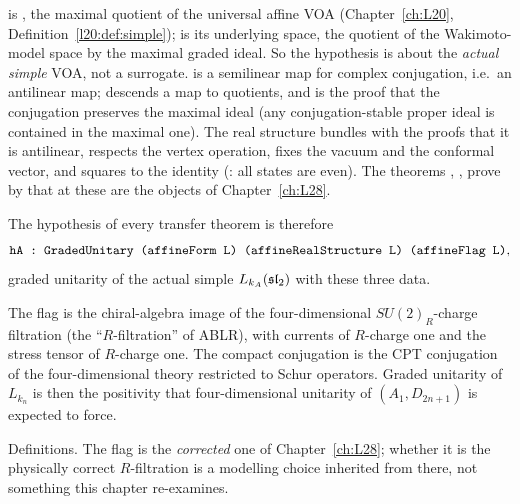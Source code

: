 \begin{dictionary}
 is , the maximal quotient
 of the universal affine VOA (Chapter~\ref{ch:L20}, Definition~\ref{l20:def:simple});
 is its underlying space, the quotient of the Wakimoto-model space  by the maximal
graded ideal. So the hypothesis is about the \emph{actual simple} VOA, not a surrogate.  is a
semilinear map for complex conjugation, i.e.\ an antilinear map;  descends a map to quotients, and
 is the proof that the conjugation preserves the maximal ideal (any
conjugation-stable proper ideal is contained in the maximal one). The real structure 
bundles  with the proofs that it is antilinear, respects the vertex operation, fixes the vacuum and
the conformal vector, and squares to the identity (: all states are even). The theorems
, ,  prove by  that at
 these are the objects of Chapter~\ref{ch:L28}.

The hypothesis of every transfer theorem is therefore
\begin{equation*}
\lean{hA : GradedUnitary (affineForm L) (affineRealStructure L) (affineFlag L)},
\end{equation*}
graded unitarity of the actual simple $L_{k_A}(\mathfrak{sl}_2)$ with these three data.
\end{dictionary}

\begin{physics}
The flag is the chiral-algebra image of the four-dimensional $SU(2)_R$-charge filtration (the ``$R$-filtration'' of
ABLR), with currents of $R$-charge one and the stress tensor of $R$-charge one. The compact conjugation is the CPT
conjugation of the four-dimensional theory restricted to Schur operators. Graded unitarity of $L_{k_n}$ is then the
positivity that four-dimensional unitarity of $(A_1,D_{2n+1})$ is expected to force.
\end{physics}

\begin{status}
Definitions. The flag is the \emph{corrected} one of Chapter~\ref{ch:L28}; whether it is the physically correct
$R$-filtration is a modelling choice inherited from there, not something this chapter re-examines.
\end{status}

